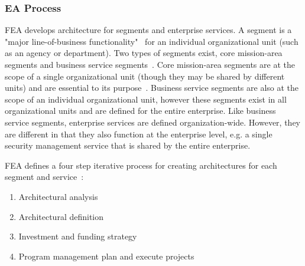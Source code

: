 \subsubsection{EA Process}


FEA develops architecture for segments and enterprise services. A segment is a "major line-of-business functionality"~\cite{sessions2007} for an individual organizational unit (such as an agency or department). Two types of segments exist, core mission-area segments and business service segments~\cite{FederalEnterpriseArchitectureProgramManagementOffice2007}. Core mission-area segments are at the scope of a single organizational unit (though they may be shared by different units) and are essential to its purpose~\cite{sessions2007,FederalEnterpriseArchitectureProgramManagementOffice2007}. Business service segments are also at the scope of an individual organizational unit, however these segments exist in all organizational units and are defined for the entire enterprise. Like business service segments, enterprise services are defined organization-wide. However, they are different in that they also function at the enterprise level, e.g. a single security management service that is shared by the entire enterprise. 

%
%

 
FEA defines a four step iterative process for creating architectures for each segment and service~\cite{FederalEnterpriseArchitectureProgramManagementOffice2007}:
\begin{enumerate}
    \item Architectural analysis
    \item Architectural definition
    \item Investment and funding strategy
    \item Program management plan and execute projects
\end{enumerate}

